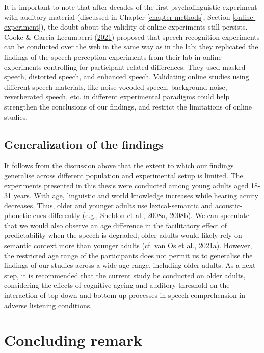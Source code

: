\documentclass[a4paper, nobind]{templates/ociamthesis}
\begin{document}
It is important to note that after decades of the first psycholinguistic experiment with auditory material (discussed in Chapter \ref{chapter-methods}, Section \ref{online-experiment}),
the doubt about the validity of online experiments still persists.
Cooke \& Garcia Lecumberri (\protect\hyperlink{ref-Cooke2021}{2021}) proposed that speech recognition experiments can be conducted over the web in the same way as in the lab;
they replicated the findings of the speech perception experiments from their lab in online experiments controlling for participant-related differences.
They used masked speech, distorted speech, and enhanced speech.
Validating online studies using different speech materials, like noise-vocoded speech, background noise, reverberated speech, etc. in different experimental paradigms could help strengthen the conclusions of our findings,
and restrict the limitations of online studies.

\hypertarget{generalization-of-the-findings}{%
\subsection{Generalization of the findings}\label{generalization-of-the-findings}}

It follows from the discussion above that the extent to which our findings generalise across different population and experimental setup is limited.
The experiments presented in this thesis were conducted among young adults aged 18-31 years.
With age, linguistic and world knowledge increases while hearing acuity decreases.
Thus, older and younger adults use lexical-semantic and acoustic-phonetic cues differently (e.g., \protect\hyperlink{ref-Sheldon2008a}{Sheldon et al., 2008a}, \protect\hyperlink{ref-Sheldon2008b}{2008b}).
We can speculate that we would also observe an age difference in the facilitatory effect of predictability when the speech is degraded;
older adults would likely rely on semantic context more than younger adults (cf. \protect\hyperlink{ref-vanOs2021a}{van Os et al., 2021a}).
However, the restricted age range of the participants does not permit us to generalise the findings of our studies across a wide age range, including older adults.
As a next step, it is recommended that the current study be conducted on older adults, considering the effects of cognitive ageing and auditory threshold
on the interaction of top-down and bottom-up processes in speech comprehension in adverse listening conditions.

\hypertarget{concluding-remark}{%
\section{Concluding remark}\label{concluding-remark}}
\end{document}
